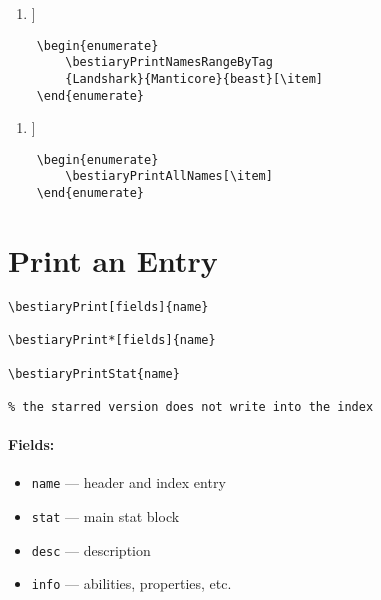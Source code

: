 \documentclass[itdr]{subfiles}
\begin{document}
\begin{enumerate}
	[\item]
\end{enumerate}

\vfill

\begin{lstlisting}
	\begin{enumerate}
		\bestiaryPrintNamesRangeByTag
		{Landshark}{Manticore}{beast}[\item]
	\end{enumerate}
\end{lstlisting}

\begin{enumerate}
	[\item]
\end{enumerate}

\vfill
\break

\begin{lstlisting}
	\begin{enumerate}
		\bestiaryPrintAllNames[\item]
	\end{enumerate}
\end{lstlisting}

\begin{enumerate}
	\bestiaryPrintAllNames[\item]
\end{enumerate}

\vfill
\break

\section{Print an Entry}

\begin{lstlisting}
\bestiaryPrint[fields]{name}

\bestiaryPrint*[fields]{name}

\bestiaryPrintStat{name}

% the starred version does not write into the index
\end{lstlisting}

\paragraph{Fields:}
\begin{itemize}
	\item \lstinline!name! --- header and index entry
	\item \lstinline!stat! --- main stat block
	\item \lstinline!desc! --- description
	\item \lstinline!info! --- abilities, properties, etc.
\end{itemize}
\end{document}
